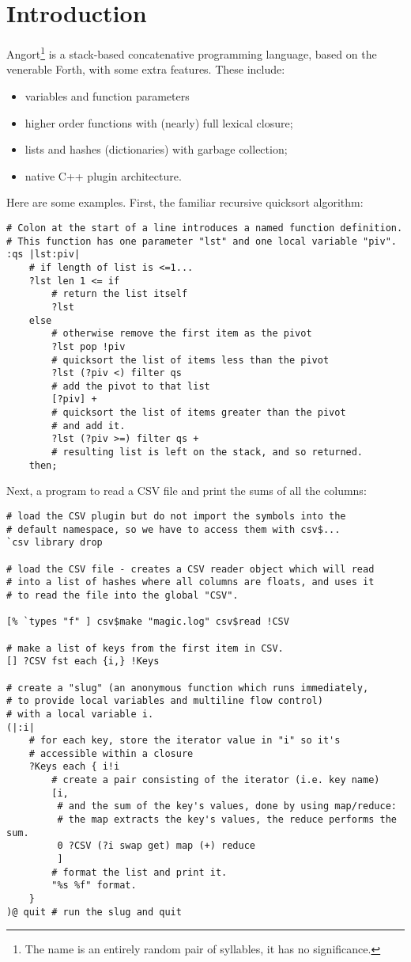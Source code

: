 \section{Introduction}
Angort\footnote{The name is an entirely random pair of syllables,
it has no significance.}
is a stack-based concatenative programming language, based on the
venerable Forth, with some
extra features. These include:
\begin{itemize}
\item variables and function parameters
\item higher order functions with (nearly) full lexical closure;
\item lists and hashes (dictionaries) with garbage collection;
\item native C++ plugin architecture.
\end{itemize}
Here are some examples. First, the familiar recursive
quicksort algorithm:
\begin{lstlisting}
# Colon at the start of a line introduces a named function definition.
# This function has one parameter "lst" and one local variable "piv".
:qs |lst:piv| 
    # if length of list is <=1...
    ?lst len 1 <= if
        # return the list itself
        ?lst 
    else 
        # otherwise remove the first item as the pivot
        ?lst pop !piv
        # quicksort the list of items less than the pivot
        ?lst (?piv <) filter qs 
        # add the pivot to that list
        [?piv] + 
        # quicksort the list of items greater than the pivot
        # and add it.
        ?lst (?piv >=) filter qs + 
        # resulting list is left on the stack, and so returned.
    then;
\end{lstlisting}
\clearpage
Next, a program to read a CSV file and print the sums of all
the columns:
\begin{lstlisting}
# load the CSV plugin but do not import the symbols into the
# default namespace, so we have to access them with csv$...
`csv library drop

# load the CSV file - creates a CSV reader object which will read
# into a list of hashes where all columns are floats, and uses it
# to read the file into the global "CSV".

[% `types "f" ] csv$make "magic.log" csv$read !CSV

# make a list of keys from the first item in CSV.
[] ?CSV fst each {i,} !Keys

# create a "slug" (an anonymous function which runs immediately,
# to provide local variables and multiline flow control)
# with a local variable i.
(|:i|
    # for each key, store the iterator value in "i" so it's
    # accessible within a closure
    ?Keys each { i!i
        # create a pair consisting of the iterator (i.e. key name)
        [i, 
         # and the sum of the key's values, done by using map/reduce:
         # the map extracts the key's values, the reduce performs the sum.
         0 ?CSV (?i swap get) map (+) reduce
         ]
        # format the list and print it.
        "%s %f" format.
    }
)@ quit # run the slug and quit
\end{lstlisting}

